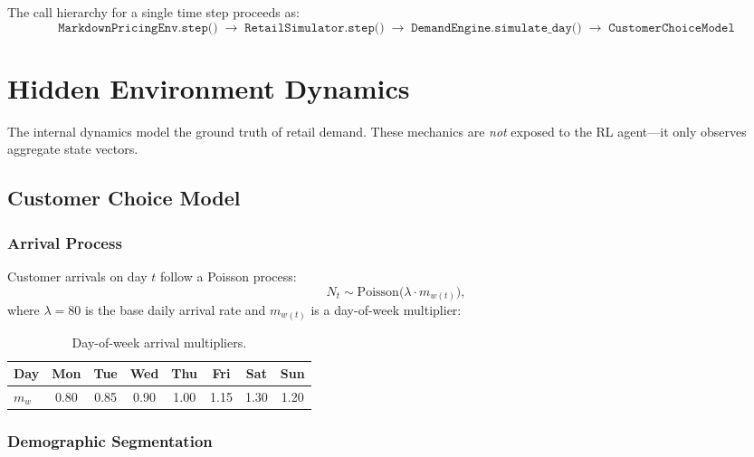 \documentclass[11pt,a4paper]{article}
\begin{document}
The call hierarchy for a single time step proceeds as:
\[
\texttt{MarkdownPricingEnv.step()} \;\longrightarrow\; \texttt{RetailSimulator.step()} \;\longrightarrow\; \texttt{DemandEngine.simulate\_day()} \;\longrightarrow\; \texttt{CustomerChoiceModel}
\]

\section{Hidden Environment Dynamics}
\label{sec:hidden_dynamics}

The internal dynamics model the ground truth of retail demand.
These mechanics are \emph{not} exposed to the RL agent---it only observes aggregate state vectors.

\subsection{Customer Choice Model}

\subsubsection{Arrival Process}

Customer arrivals on day $t$ follow a Poisson process:
\begin{equation}
N_t \sim \mathrm{Poisson}\bigl(\lambda \cdot m_{w(t)}\bigr),
\end{equation}
where $\lambda = 80$ is the base daily arrival rate and $m_{w(t)}$ is a day-of-week multiplier:

\begin{table}[H]
\centering
\caption{Day-of-week arrival multipliers.}
\begin{tabular}{@{}lccccccc@{}}
\toprule
Day & Mon & Tue & Wed & Thu & Fri & Sat & Sun \\
\midrule
$m_w$ & 0.80 & 0.85 & 0.90 & 1.00 & 1.15 & 1.30 & 1.20 \\
\bottomrule
\end{tabular}
\end{table}

\subsubsection{Demographic Segmentation}
\end{document}
